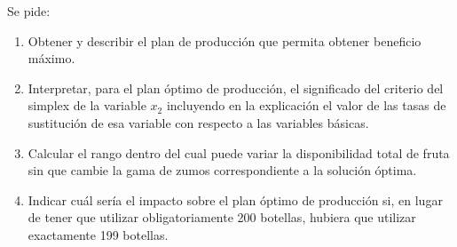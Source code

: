 Se pide:

\begin{enumerate}[label=\alph*)]
    \item Obtener y describir el plan de producción que permita obtener beneficio máximo.

    \item Interpretar, para el plan óptimo de producción, el significado del criterio del simplex de la variable $x_2$ incluyendo en la explicación el valor de las tasas de sustitución de esa variable con respecto a las variables básicas.
    
    \item Calcular el rango dentro del cual puede variar la disponibilidad total de fruta sin que cambie la gama de zumos correspondiente a la solución óptima.

    \item Indicar cuál sería el impacto sobre el plan óptimo de producción si, en lugar de tener que utilizar obligatoriamente 200 botellas, hubiera que utilizar exactamente 199 botellas.

\end{enumerate}









 
